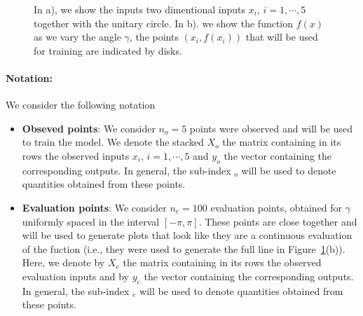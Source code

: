 \documentclass[a4paper,10pt]{article}
\begin{document}
\begin{figure}[H]
    \centering
    \caption{In a), we show the inputs two dimentional inputs $x_i$, $i = 1, \cdots, 5$ together with the unitary circle. In b). we show the function $f(x)$ as we vary the angle $\gamma$, the points $(x_i, f(x_i))$ that will be used for training are indicated by disks.}
    \label{fig:dataset}
\end{figure}

\paragraph{Notation:}  We consider the following notation
\begin{itemize}
    \item \textbf{Obseved points}: We consider $n_o=5$ points were observed and will be used to train the model. We denote the stacked $X_o$ the matrix containing in its rows the observed inputs $x_i$, $i = 1, \cdots, 5$ and $y_o$ the vector containing the corresponding outputs. In general, the sub-index $_o$ will be used to denote quantities obtained from these points.
    \item \textbf{Evaluation points}: We consider $n_e = 100$ evaluation points, obtained for $\gamma$ uniformly spaced in the interval $[-\pi, \pi]$. These points are close together and will be used to generate plots that look like they are a continuous evaluation of the fuction (i.e., they were used to generate the full line in Figure~\ref{fig:dataset}(b)). Here, we denote by $X_e$ the matrix containing in its rows the observed evaluation inputs  and by  $y_e$ the vector containing the corresponding outputs. In general, the sub-index $_e$ will be used to denote quantities obtained from these points.
\end{itemize}
\end{document}
